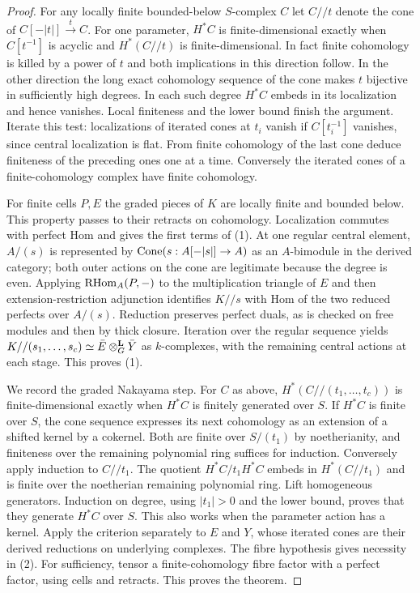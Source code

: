 \documentclass[11pt]{article}
\begin{document}
\begin{proof}
For any locally finite bounded-below $S$-complex $C$ let $C//t$ denote
the cone of $C[-|t|]\xrightarrow{t} C$. For one parameter, $H^*C$ is
finite-dimensional exactly when $C[t^{-1}]$ is acyclic and $H^*(C//t)$
is finite-dimensional. In fact finite cohomology is killed by a power
of $t$ and both implications in this direction follow. In the other
direction the long exact cohomology sequence of the cone makes $t$
bijective in sufficiently high degrees. In each such degree $H^*C$
embeds in its localization and hence vanishes. Local finiteness and
the lower bound finish the argument. Iterate this test: localizations
of iterated cones at $t_i$ vanish if $C[t_i^{-1}]$ vanishes, since
central localization is flat. From finite cohomology of the last cone
deduce finiteness of the preceding ones one at a time. Conversely the
iterated cones of a finite-cohomology complex have finite cohomology.

For finite cells $P,E$ the graded pieces of $K$ are locally finite and
bounded below. This property passes to their retracts on cohomology.
Localization commutes with perfect Hom and gives the first terms of
(1). At one regular central element, $A/(s)$ is represented by
$\operatorname{Cone}(s:A[-|s|]\to A)$ as an $A$-bimodule in the derived category;
both outer actions on the cone are legitimate because the degree is
even. Applying $\operatorname{RHom}_A(P,-)$ to the multiplication triangle of $E$ and
then extension-restriction adjunction identifies $K//s$ with Hom of
the two reduced perfects over $A/(s)$. Reduction preserves perfect
duals, as is checked on free modules and then by thick closure.
Iteration over the regular sequence yields
$K//(s_1,\ldots,s_c)\simeq \bar E\otimes^{\mathbf L}_G\bar Y$ as $k$-complexes,
with the remaining central actions at each stage. This proves (1).

We record the graded Nakayama step. For $C$ as above,
$H^*(C//(t_1,\ldots,t_c))$ is finite-dimensional exactly when
$H^*C$ is finitely generated over $S$. If $H^*C$ is finite over $S$,
the cone sequence expresses its next cohomology as an extension of a
shifted kernel by a cokernel. Both are finite over $S/(t_1)$ by
noetherianity, and finiteness over the remaining polynomial ring suffices
for induction. Conversely apply induction to $C//t_1$. The quotient
$H^*C/t_1H^*C$ embeds in $H^*(C//t_1)$ and is finite over the
noetherian remaining polynomial ring. Lift homogeneous generators.
Induction on degree, using $|t_1|>0$ and the lower bound, proves that
they generate $H^*C$ over $S$. This also works when the parameter action
has a kernel. Apply the criterion separately to $E$ and $Y$, whose
iterated cones are their derived reductions on underlying complexes.
The fibre hypothesis gives necessity in (2). For sufficiency, tensor
a finite-cohomology fibre factor with a perfect factor, using cells and
retracts. This proves the theorem.
\end{proof}
\end{document}
